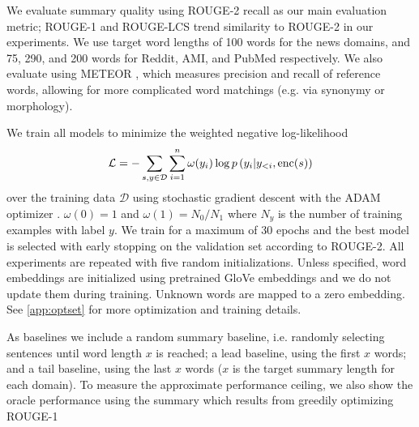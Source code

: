
We evaluate summary quality using ROUGE-2 recall \cite{lin2004rouge} 
as our main evaluation metric;
ROUGE-1 and ROUGE-LCS trend similarity to ROUGE-2 in our experiments.
We use target word lengths of 100 words for the news domains, and 
75, 290, and 200 words for Reddit, AMI, and PubMed respectively.
We also evaluate using METEOR \cite{denkowski:lavie:meteor-wmt:2014},
which measures precision and recall of reference words, allowing for
more complicated word matchings (e.g. via synonymy or morphology).



We train all models to minimize the weighted negative log-likelihood
\[\mathcal{L} = -\sum_{s,y\in \mathcal{D}} \sum_{i=1}^\docSize \omega(y_i) \log p\left(y_i|y_{<i},
\operatorname{enc}(\sent)\right)\]
over the training data $\mathcal{D}$
using stochastic gradient descent with the ADAM optimizer
\cite{kingma2014adam}.
$\omega(0)=1$ and $\omega(1) = N_0/N_1$ where $N_y$ is the number of 
training examples with label $y$.
    We train for a maximum of 30 epochs and the best
    model is selected with early stopping on the validation set according
    to ROUGE-2. All experiments are repeated with five random
    initializations.     Unless specified, word embeddings are initialized 
    using pretrained GloVe embeddings \cite{pennington2014glove} and we do 
    not update them during training. Unknown words are mapped to a zero 
    embedding.
    See \autoref{app:optset} for more optimization and training details.

As baselines we include a random summary baseline, i.e. randomly selecting sentences until word length $x$ is reached; a lead baseline, using 
the first $x$ words;  and a tail baseline, using the last $x$ words
($x$ is the target summary length for each domain).
To measure the approximate performance ceiling,
we also show the oracle performance using the 
summary which results from greedily optimizing ROUGE-1 

